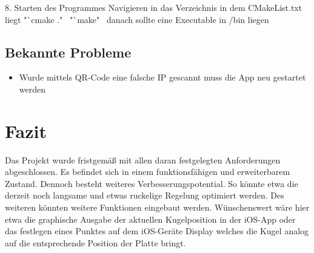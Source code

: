 \documentclass[12pt,a4paper,bibliography=totoc,listof=totoc]{scrartcl}
\begin{document}
8. Starten des Programmes  Navigieren in das Verzeichnis in dem CMakeList.txt liegt  "`cmake ."\  "`make"\  danach sollte eine Executable in /bin liegen 


\subsection{Bekannte Probleme}
\begin{itemize}
    \item Wurde mittels QR-Code eine falsche IP gescannt muss die App neu gestartet werden\,
\end {itemize}


\pagebreak
\section{Fazit}
Das Projekt wurde fristgemäß mit allen daran festgelegten Anforderungen abgeschlossen. Es befindet sich in einem 
funktionsfähigen und erweiterbarem Zustand. Dennoch besteht weiteres Verbesserungspotential. So könnte etwa die 
derzeit noch langsame und etwas ruckelige Regelung optimiert werden. Des weiteren könnten weitere Funktionen eingebaut werden. 
Wünschenswert wäre hier etwa die graphische Ausgabe der aktuellen Kugelposition in der iOS-App oder das festlegen eines Punktes auf
dem iOS-Geräte Display welches die Kugel analog auf die entsprechende Position der Platte bringt.


\end{document}

